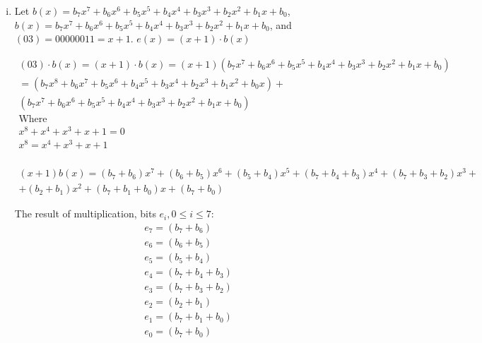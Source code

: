 \documentclass[11pt]{article}
\theoremstyle{definition}
\begin{document}
\begin{enumerate}[a. ]
\begin{enumerate}[i. ]
      \item
        Let $b(x) = b_7x^7 + b_6x^6 + b_5x^5 + b_4x^4 + b_3x^3 + b_2x^2 + b_1x + b_0$, $b(x) = b_7x^7 + b_6x^6 + b_5x^5 + b_4x^4 + b_3x^3 + b_2x^2 + b_1x + b_0$, and $(03) = 0000 0011 = x + 1$. $e(x) = (x + 1) \cdot b(x)$

        \begin{align*}
          (03) \cdot b(x) = (x + 1) \cdot b(x) = (x + 1)(b_7x^7 + b_6x^6 + b_5x^5 + b_4x^4 + b_3x^3 + b_2x^2 + b_1x + b_0) \\
                          = (b_7x^8 + b_6x^7 + b_5x^6 + b_4x^5 + b_3x^4 + b_2x^3 + b_1x^2 + b_0x) + \\
          (b_7x^7 + b_6x^6 + b_5x^5 + b_4x^4 + b_3x^3 + b_2x^2 + b_1x + b_0) \\
          \text{Where } \\
          x^8 + x^4 + x^3 + x + 1 = 0 \\
          x^8 = x^4 + x^3 + x + 1 \\
        \end{align*}

        \begin{align*}
          (x + 1)b(x) = (b_7 + b_6)x^7 + (b_6 + b_5)x^6 + (b_5 + b_4)x^5 + (b_7 + b_4 + b_3)x^4 + (b_7 + b_3 + b_2)x^3 + \\ + (b_2 + b_1)x^2 + (b_7 + b_1 + b_0)x + (b_7 + b_0)
        \end{align*}

        The result of multiplication, bits $e_i, 0 \leq i \leq 7$:
        \begin{align*}
          &e_7 = (b_7 + b_6) \\
          &e_6 = (b_6 + b_5) \\
          &e_5 = (b_5 + b_4) \\
          &e_4 = (b_7 + b_4 + b_3) \\
          &e_3 = (b_7 + b_3 + b_2) \\
          &e_2 = (b_2 + b_1) \\
          &e_1 = (b_7 + b_1 + b_0) \\
          &e_0 = (b_7 + b_0)
        \end{align*}
    \end{enumerate}


\end{enumerate}
\end{document}
